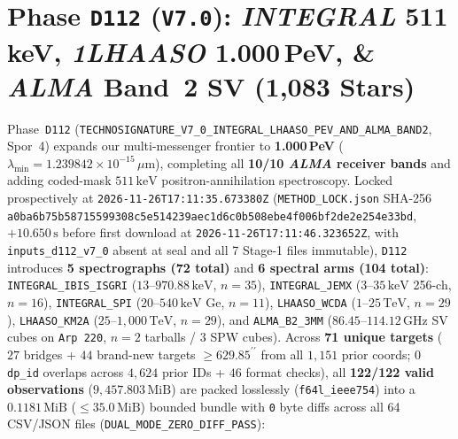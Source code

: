 \documentclass[twocolumn,10pt]{article}
\begin{document}
\section{Phase \texttt{D112} (\texttt{V7.0}): \textit{INTEGRAL} 511\,keV, \textit{1LHAASO} 1.000\,PeV, \& \textit{ALMA} Band~2 SV (1,083 Stars)}
\label{sec:d112}
Phase~\texttt{D112} (\texttt{TECHNOSIGNATURE\_\allowbreak V7\_0\_\allowbreak INTEGRAL\_\allowbreak LHAASO\_\allowbreak PEV\_\allowbreak AND\_\allowbreak ALMA\_\allowbreak BAND2}, Spor~4) expands our multi-messenger frontier to \textbf{1.000\,PeV} ($\lambda_{\min} = 1.239842\times 10^{-15}\,\mu\text{m}$), completing all \textbf{10/10 \textit{ALMA} receiver bands} and adding coded-mask $511\,\mathrm{keV}$ positron-annihilation spectroscopy. Locked prospectively at \texttt{2026-11-26T17:11:35.673380Z} (\texttt{METHOD\_LOCK.json} SHA-256 \texttt{a0ba6b75\allowbreak b5871559\allowbreak 9308c5e5\allowbreak 14239aec\allowbreak 1d6c0b50\allowbreak 8ebe4f00\allowbreak 6bf2de2e\allowbreak 254e33bd}, $+10.650\,\text{s}$ before first download at \texttt{2026-11-26T17:11:46.323652Z}, with \texttt{inputs\_d112\_v7\_0} absent at seal and all 7 Stage-1 files immutable), \texttt{D112} introduces \textbf{5 spectrographs (72 total)} and \textbf{6 spectral arms (104 total)}: \texttt{INTEGRAL\_IBIS\_ISGRI} ($13\text{--}970.88\,\mathrm{keV}$, $n=35$), \texttt{INTEGRAL\_JEMX} ($3\text{--}35\,\mathrm{keV}$ 256-ch, $n=16$), \texttt{INTEGRAL\_SPI} ($20\text{--}540\,\mathrm{keV}$ Ge, $n=11$), \texttt{LHAASO\_WCDA} ($1\text{--}25\,\mathrm{TeV}$, $n=29$), \texttt{LHAASO\_KM2A} ($25\text{--}1{,}000\,\mathrm{TeV}$, $n=29$), and \texttt{ALMA\_B2\_3MM} ($86.45\text{--}114.12\,\mathrm{GHz}$ SV cubes on \texttt{Arp\,220}, $n=2$ tarballs / $3$ SPW cubes). Across \textbf{71 unique targets} ($27$ bridges + $44$ brand-new targets $\ge 629.85^{\prime\prime}$ from all $1{,}151$ prior coords; $0$ \texttt{dp\_id} overlaps across $4{,}624$ prior IDs + $46$ format checks), all \textbf{122/122 valid observations} ($9{,}457.803\,\mathrm{MiB}$) are packed losslessly (\texttt{f64l\_ieee754}) into a $0.1181\,\mathrm{MiB}$ ($\le 35.0\,\mathrm{MiB}$) bounded bundle with \texttt{0} byte diffs across all 64 CSV/JSON files (\texttt{DUAL\_MODE\_ZERO\_DIFF\_PASS}):
\end{document}
